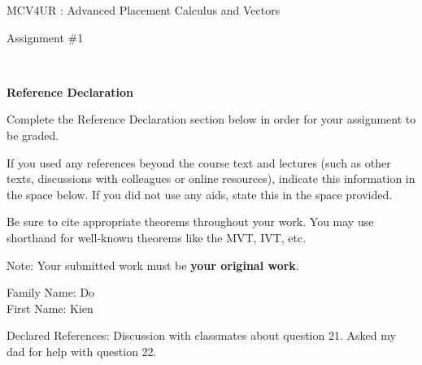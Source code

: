 \documentclass[12pt]{book}
\begin{document}
\vspace{-1.0in}\begin{center}
\Large{MCV4UR : Advanced Placement Calculus and Vectors }

\Large{Assignment \#1}


\end{center}


\vspace{0.015in}\hrulefill\ 

\textbf{Reference Declaration} %

Complete the Reference Declaration section below in order for your assignment to be graded.

If you used any references beyond the course text and lectures (such as other texts, discussions with colleagues or online resources), indicate this information in the space below.  If you did not use any aids, state this in the space provided. 

Be sure to cite appropriate theorems throughout your work. You may use shorthand for well-known theorems like the MVT, IVT, etc. 

Note: Your submitted work must be \textbf{your original work}. 

Family Name: Do \\%
First Name: Kien %

Declared References: Discussion with classmates about question 21. Asked my dad for help with question 22.


\vspace{0.015in}\hrulefill\ 

\newpage

\end{document}
